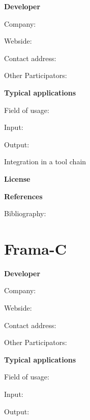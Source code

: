 \documentclass{./template/openetcs_report}
\begin{document}
	\textbf{Developer}

	Company: 

	Webside:

	Contact address:

	Other  Participators:



	\textbf{Typical applications}

	Field of usage:


	Input:

	Output:





	Integration in a tool chain



	\textbf{License}


	\textbf{References}

	Bibliography:


\section{Frama-C}

	\textbf{Developer}

	Company: 

	Webside:

	Contact address:

	Other  Participators:



	\textbf{Typical applications}

	Field of usage:


	Input:

	Output:

\end{document}
